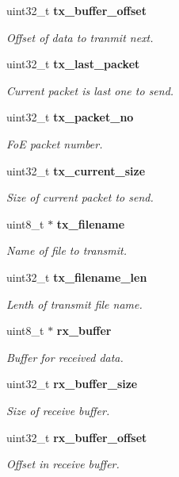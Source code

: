 \begin{DoxyCompactItemize}
uint32\-\_\-t {\bf tx\-\_\-buffer\-\_\-offset}
\begin{DoxyCompactList}\small\item\em \-Offset of data to tranmit next. \end{DoxyCompactList}\item 
uint32\-\_\-t {\bf tx\-\_\-last\-\_\-packet}
\begin{DoxyCompactList}\small\item\em \-Current packet is last one to send. \end{DoxyCompactList}\item 
uint32\-\_\-t {\bf tx\-\_\-packet\-\_\-no}
\begin{DoxyCompactList}\small\item\em \-Fo\-E packet number. \end{DoxyCompactList}\item 
uint32\-\_\-t {\bf tx\-\_\-current\-\_\-size}
\begin{DoxyCompactList}\small\item\em \-Size of current packet to send. \end{DoxyCompactList}\item 
uint8\-\_\-t $\ast$ {\bf tx\-\_\-filename}
\begin{DoxyCompactList}\small\item\em \-Name of file to transmit. \end{DoxyCompactList}\item 
uint32\-\_\-t {\bf tx\-\_\-filename\-\_\-len}
\begin{DoxyCompactList}\small\item\em \-Lenth of transmit file name. \end{DoxyCompactList}\item 
uint8\-\_\-t $\ast$ {\bf rx\-\_\-buffer}
\begin{DoxyCompactList}\small\item\em \-Buffer for received data. \end{DoxyCompactList}\item 
uint32\-\_\-t {\bf rx\-\_\-buffer\-\_\-size}
\begin{DoxyCompactList}\small\item\em \-Size of receive buffer. \end{DoxyCompactList}\item 
uint32\-\_\-t {\bf rx\-\_\-buffer\-\_\-offset}
\begin{DoxyCompactList}\small\item\em \-Offset in receive buffer. \end{DoxyCompactList}\item 

\end{DoxyCompactItemize}
